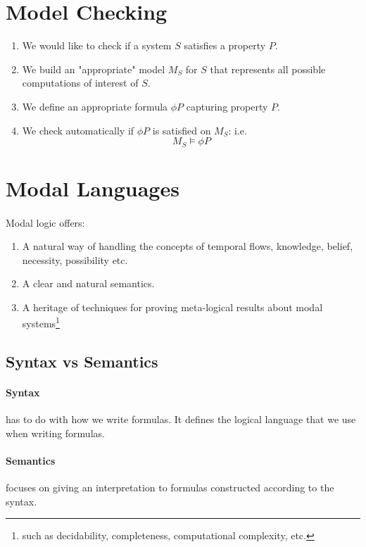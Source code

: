 \documentclass{article}
\theoremstyle{plain}
\theoremstyle{definition}
\begin{document}
\begin{multicols}{2}
\tableofcontents
\newpage

\section{Model Checking}

\begin{enumerate}
\item We would like to check if a system $S$ satisfies a property $P$.
\item We build an "appropriate" model $M_S$ for $S$ that represents all possible computations of interest of $S$.
\item We define an appropriate formula $\phi P$ capturing property $P$.
\item We check automatically if $\phi P$ is satisfied on $M_S$: i.e. $$M_S \models \phi P$$
\end{enumerate}

\section{Modal Languages}

\paragraph{} Modal logic offers:
\begin{enumerate}
\item A natural way of handling the concepts of temporal flows, knowledge, belief, necessity, possibility etc.
\item A clear and natural semantics.
\item A heritage of techniques for proving meta-logical results about modal systems\footnote{such as decidability, completeness, computational complexity, etc.}
\end{enumerate}

\subsection{Syntax vs Semantics}

\paragraph{Syntax} has to do with how we write formulas. It defines the logical language that we use when writing formulas.

\paragraph{Semantics} focuses on giving an interpretation to formulas constructed according to the syntax.


\end{multicols}
\end{document}
